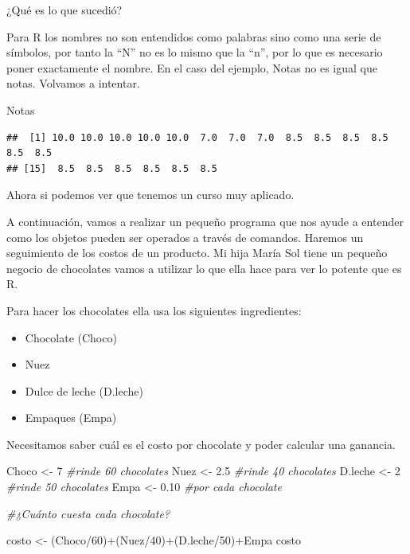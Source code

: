 \documentclass[]{article}
\newenvironment{Shaded}{\begin{snugshade}}{\end{snugshade}}
\newcommand{\DecValTok}[1]{\textcolor[rgb]{0.00,0.00,0.81}{{#1}}}
\newcommand{\FloatTok}[1]{\textcolor[rgb]{0.00,0.00,0.81}{{#1}}}
\newcommand{\StringTok}[1]{\textcolor[rgb]{0.31,0.60,0.02}{{#1}}}
\newcommand{\CommentTok}[1]{\textcolor[rgb]{0.56,0.35,0.01}{\textit{{#1}}}}
\newcommand{\NormalTok}[1]{{#1}}
\providecommand{\tightlist}{%
  \setlength{\itemsep}{0pt}\setlength{\parskip}{0pt}}
\begin{document}
¿Qué es lo que sucedió?

Para R los nombres no son entendidos como palabras sino como una serie
de símbolos, por tanto la ``N'' no es lo mismo que la ``n'', por lo que
es necesario poner exactamente el nombre. En el caso del ejemplo, Notas
no es igual que notas. Volvamos a intentar.

\begin{Shaded}
\begin{Highlighting}[]
\NormalTok{Notas}
\end{Highlighting}
\end{Shaded}

\begin{verbatim}
##  [1] 10.0 10.0 10.0 10.0 10.0  7.0  7.0  7.0  8.5  8.5  8.5  8.5  8.5  8.5
## [15]  8.5  8.5  8.5  8.5  8.5  8.5
\end{verbatim}

Ahora si podemos ver que tenemos un curso muy aplicado.

A continuación, vamos a realizar un pequeño programa que nos ayude a
entender como los objetos pueden ser operados a través de comandos.
Haremos un seguimiento de los costos de un producto. Mi hija María Sol
tiene un pequeño negocio de chocolates vamos a utilizar lo que ella hace
para ver lo potente que es R.

Para hacer los chocolates ella usa los siguientes ingredientes:

\begin{itemize}
\tightlist
\item
  Chocolate (Choco)
\item
  Nuez
\item
  Dulce de leche (D.leche)
\item
  Empaques (Empa)
\end{itemize}

Necesitamos saber cuál es el costo por chocolate y poder calcular una
ganancia.

\begin{Shaded}
\begin{Highlighting}[]
\NormalTok{Choco <-}\StringTok{ }\DecValTok{7} \CommentTok{#rinde 60 chocolates}
\NormalTok{Nuez <-}\StringTok{ }\FloatTok{2.5} \CommentTok{#rinde 40 chocolates}
\NormalTok{D.leche <-}\StringTok{ }\DecValTok{2} \CommentTok{#rinde 50 chocolates}
\NormalTok{Empa <-}\StringTok{ }\FloatTok{0.10} \CommentTok{#por cada chocolate}

\CommentTok{#¿Cuánto cuesta cada chocolate?}

\NormalTok{costo <-}\StringTok{ }\NormalTok{(Choco/}\DecValTok{60}\NormalTok{)+(Nuez/}\DecValTok{40}\NormalTok{)+(D.leche/}\DecValTok{50}\NormalTok{)+Empa}
\NormalTok{costo}
\end{Highlighting}
\end{Shaded}
\end{document}
